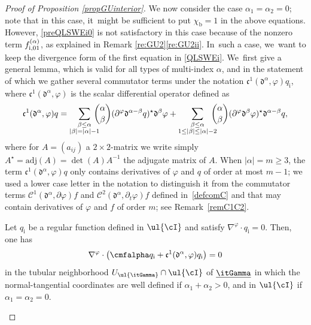 \begin{proof}[Proof of Proposition \ref{propGUinterior}]
We now consider the case $\alpha_1=\alpha_2=0$; note that in this case, it~might be sufficient to put $\chi_\mathrm{b}=1$ in the above equations.
However, \eqref{preQLSWEi0} is not satisfactory in this case because of the nonzero term $f_{{\rm i},01}^{(\alpha)}$, as explained in Remark \ref{re:GU2}\eqref{re:GU2ii}. In~such a case, we~want to keep the divergence form of the first equation in \eqref{QLSWEi}. We~first give a general lemma, which is valid for all types of multi-index $\alpha$,
and in the statement of which we gather several commutator terms under the notation ${\mathfrak c}^1({\mathfrak d}^\alpha,\varphi)q_\mathrm{i}$,
where ${\mathfrak c}^1({\mathfrak d}^\alpha,\varphi)$ is the scalar differential operator defined as
\begin{equation}
\mathfrak{c}^1({\mathfrak d}^\alpha,\varphi) q
= \sum_{\substack{\beta\leq\alpha\\ |\beta|=|\alpha|-1}}\hspace*{-3mm}\binom{\alpha}{\beta} (\partial^\varphi\mathfrak{d}^{\alpha-\beta} q)^\star \mathfrak{d}^{\beta}\varphi
+ \sum_{\substack{\beta\leq\alpha\\ 1 \leq |\beta| \leq |\alpha|-2}} \hspace*{-3mm}\binom{\alpha}{\beta}
(\partial^\varphi\mathfrak{d}^{\beta}\varphi)^\star \mathfrak{d}^{\alpha-\beta} q,
\end{equation}
where for $A=(a_{ij})$ a $2\times2$-matrix we write simply $A^\star=\mbox{adj}(A)=\det(A)A^{-1}$ the adjugate matrix of $A$.
When $\vert \alpha\vert=m\geq 3$,
the term $\mathfrak{c}^1({\mathfrak d}^\alpha,\varphi) q$ only contains derivatives of $\varphi$ and $q$ of order at most $m-1$;
we used a lower case letter in the notation to distinguish it from the commutator terms ${\mathcal C}^1(\mathfrak{d}^\alpha,\partial \varphi)f$ and
${\mathcal C}^2(\mathfrak{d}^\alpha,\partial_t \varphi)f$ defined in~\eqref{defcomC} and that may contain derivatives of $\varphi$ and $f$ of order $m$;
see Remark~\ref{remC1C2}.

\begin{lemma}
Let $q_\mathrm{i}$ be a regular function defined in $\ul{\cI}$ and satisfy $\nabla^\varphi\cdot q_\mathrm{i}=0$.
Then, one has
\[
\nabla^\varphi\cdot\big(\cmfalpha q_\mathrm{i} + \mathfrak{c}^1({\mathfrak d}^\alpha,\varphi) q_\mathrm{i} \big) = 0
\]
in the tubular neighborhood $U_{\ul{\itGamma}}\cap \ul{\cI}$ of $\underline{\itGamma}$
in which the normal-tangential coordinates are well defined if $\alpha_1+\alpha_2>0$, and in $\ul{\cI}$ if $\alpha_1=\alpha_2=0$.
\end{lemma}


\end{proof}
